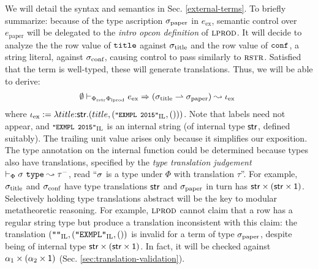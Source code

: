 \documentclass[preprint]{sigplanconf}
\newcommand{\moutput}{^{\color{gray}-}}
\begin{document}
We will detail the syntax and semantics in Sec. \ref{external-terms}. To briefly summarize: because of the type ascription $\sigma_\text{paper}$ in $e_\text{ex}$, semantic control over $e_\text{paper}$ will be delegated to the \emph{intro opcon definition} of $\textsc{lprod}$. It will decide to analyze the the row value of $\texttt{title}$ against $\sigma_\text{title}$ and the row value of $\texttt{conf}$, a string literal, against $\sigma_\text{conf}$, causing control to pass similarly to $\textsc{rstr}$. Satisfied that the term is well-typed, these will generate translations. Thus, we will be able to derive:
\[\hspace{-5px}\begin{array}{l}\esyn{\emptyset}{\Phi_\text{rstr}\Phi_\text{lprod}}{e_\text{ex}}{(\stx{title}\rightharpoonup\stx{paper})}{\iota_\text{ex}}\end{array}\]
where $\small\iota_\text{ex} := \ilam{\keyw{str}}{title}{(title, (\texttt{"EXMPL 2015"}_\text{IL}, ()))}$. Note that labels need not appear, and $\small\texttt{"EXMPL 2015"}_\text{IL}$ is an internal string (of internal type ${\sf str}$, defined suitably). The trailing unit value arises only because it simplifies our exposition. The type annotation on the internal function could be determined because types also have translations, specified by the \emph{type translation judgement} $\vdash_\Phi \st~\mathtt{type} \leadsto \tau\moutput$, read ``$\sigma$ is a type under $\Phi$ with translation $\tau$''. For example, $\sigma_\text{title}$  and $\sigma_\text{conf}$ have type translations  ${\sf str}$ and  $\sigma_\text{paper}$ in turn has ${\sf str}\times({\sf str}\times{\sf 1})$. Selectively holding type translations abstract will be the key to modular metatheoretic reasoning. For example, $\textsc{lprod}$ cannot claim that a row has a regular string type but produce a translation inconsistent with this claim: the translation $(\texttt{""}_\text{IL}, (\texttt{"EXMPL"}_\text{IL}, ())$ is invalid for a term of type $\sigma_\text{paper}$, despite being of internal type ${\sf str}\times({\sf str}\times{\sf 1})$. In fact, it will be checked against $\alpha_1 \times (\alpha_2 \times {\sf 1})$ (Sec. \ref{sec:translation-validation}).

\end{document}
